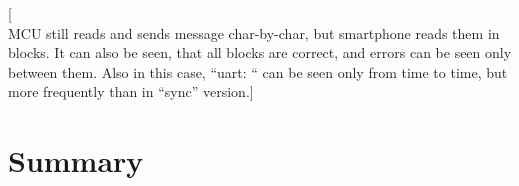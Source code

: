 [\\MCU still reads and sends message char-by-char, but smartphone reads them in
blocks. It can also be seen, that all blocks are correct, and errors can be
seen only between them. Also in this case, ``uart: `` can be seen only from
time to time, but more frequently than in ``sync'' version.]


\section{Summary}
